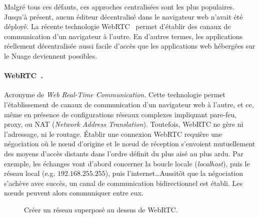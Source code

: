 Malgré tous ces défauts, ces approches centralisées sont les plus populaires.
Jusqu'à présent, aucun éditeur décentralisé dans le navigateur web n'avait été
déployé. La récente technologie WebRTC~\cite{webrtc} permet d'établir des canaux
de communication d'un navigateur à l'autre. En d'autres termes, les applications
réellement décentralisée aussi facile d'accès que les applications web hébergées
sur le Nuage deviennent possibles.

\paragraph{WebRTC~\cite{webrtc}.} Acronyme de \emph{Web Real-Time
  Communication}.  Cette technologie permet l'établissement de canaux de
communication d'un navigateur web à l'autre, et ce, même en présence de
configurations réseaux complexes impliquant pare-feu, proxy, ou NAT
(\emph{Network Address Translation}). Toutefois, WebRTC ne gère ni l'adressage,
ni le routage.  Établir une connexion WebRTC requière une négociation où le nœud
d'origine et le nœud de réception s'envoient mutuellement des moyens d'accès
distants dans l'ordre définit du plus aisé au plus ardu. Par exemple, les
échanges vont d'abord concerner la boucle locale (\emph{localhost}), puis le
réseau local (e.g. $192.168.255.255$), puis l'internet\ldots Aussitôt que la
négociation s'achève avec succès, un canal de communication bidirectionnel est
établi. Les nœuds peuvent alors communiquer entre eux.

\begin{figure*}
  \begin{center}
    \hspace{5pt}
    \hspace{5pt}
    \caption[Création d'un réseau superposé sur WebRTC]
    {\label{fig:webrtc}Créer un réseau superposé au dessus de WebRTC.}
  \end{center}
\end{figure*}

